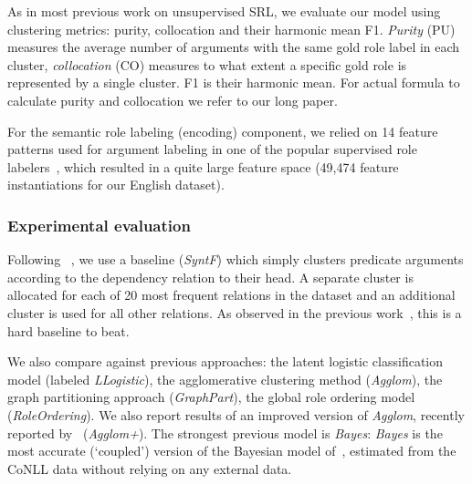 As in most previous work on unsupervised SRL, we evaluate our model using clustering metrics: purity, collocation and their harmonic mean F1. 
\emph{Purity} (PU) measures the average number of arguments with the same gold
role label in each cluster, \emph{collocation} (CO) measures to what extent a specific gold role is represented by a single cluster. 
F1 is their harmonic mean.
For actual formula to calculate purity and collocation we refer to our long
paper.

For the semantic role labeling (encoding) component,
we relied on 14 feature patterns used for argument labeling in one of the
popular supervised role labelers~\citep{johansson2008}, which resulted in a
quite large feature space (49,474 feature instantiations for our English dataset).

\subsubsection{Experimental evaluation}
\label{sssec:eval}
Following ~\citep{Lang10}, we use a baseline ({\em SyntF}) which simply
clusters predicate arguments according to the dependency relation to their head.
A separate cluster is allocated for each of 20 
most frequent relations in the dataset and an additional cluster is used for all
other relations.
As observed in the previous work~\citep{Lang11a}, this is a hard baseline to beat. %

We also compare against previous approaches:
the latent logistic classification model \citep{Lang10}  (labeled {\em LLogistic}), 
the  agglomerative clustering  method \citep{Lang11a} ({\em Agglom}),  the graph partitioning approach \citep{Lang11b} ({\em GraphPart}),
the global role ordering model~\citep{garg2012} ({\em RoleOrdering}). We also report results of an  improved version of {\em Agglom},
recently reported by~\citet{Lang14} ({\em Agglom+}).
The strongest previous model is {\em Bayes}: {\em Bayes} is the most accurate (`coupled') version of  
the Bayesian model of~\citet{TitovKlementEacl12},
estimated from the CoNLL data without relying on any external data.

